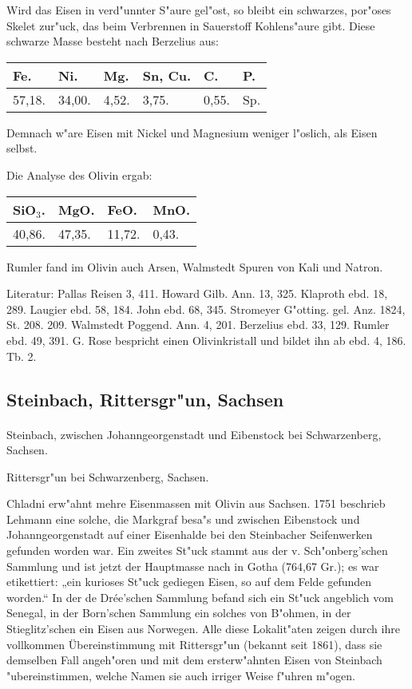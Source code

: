 \documentclass[a4paper, 11pt, oneside]{article}
\begin{document}
Wird das Eisen in verd"unnter S"aure gel"ost, so bleibt ein schwarzes, por"oses Skelet zur"uck, das beim Verbrennen in Sauerstoff Kohlens"aure gibt. Diese schwarze Masse besteht nach Berzelius aus:
\begin{table}[H]
    \centering
    \begin{tabular}{l l l l l l}
        Fe. & Ni. & Mg. & Sn, Cu. & C. & P. \\ \hline
        57,18. & 34,00. & 4,52. & 3,75. & 0,55. & Sp. \\
    \end{tabular}
\end{table}

Demnach w"are Eisen mit Nickel und Magnesium weniger l"oslich, als Eisen selbst.

Die Analyse des Olivin ergab:
\begin{table}[H]
    \centering
    \begin{tabular}{l l l l}
        SiO$_{3}$. & MgO. & FeO. & MnO. \\ \hline
        40,86. & 47,35. & 11,72. & 0,43. \\
    \end{tabular}
\end{table}

Rumler fand im Olivin auch Arsen, Walmstedt Spuren von Kali und Natron.

\footnotesize
Literatur: Pallas Reisen 3, 411. Howard Gilb. Ann. 13, 325. Klaproth ebd. 18, 289. Laugier ebd. 58, 184. John ebd. 68, 345. Stromeyer G"otting. gel. Anz. 1824, St. 208. 209. Walmstedt Poggend. Ann. 4, 201. Berzelius ebd. 33, 129. Rumler ebd. 49, 391. G. Rose bespricht einen Olivinkristall und bildet ihn ab ebd. 4, 186. Tb. 2.

\subsection{Steinbach, Rittersgr"un, Sachsen}
\normalsize
\paragraph{}
Steinbach, zwischen Johanngeorgenstadt und Eibenstock bei Schwarzenberg, Sachsen.

Rittersgr"un bei Schwarzenberg, Sachsen.

Chladni erw"ahnt mehre Eisenmassen mit Olivin aus Sachsen. 1751 beschrieb Lehmann eine solche, die Markgraf besa"s und zwischen Eibenstock und Johanngeorgenstadt auf einer Eisenhalde bei den Steinbacher Seifenwerken gefunden worden war. Ein zweites St"uck stammt aus der v. Sch"onberg'schen Sammlung und ist jetzt der Hauptmasse nach in Gotha (764,67 Gr.); es war etikettiert: „ein kurioses St"uck gediegen Eisen, so auf dem Felde gefunden worden.“ In der de Drée'schen Sammlung befand sich ein St"uck angeblich vom Senegal, in der Born'schen Sammlung ein solches von B"ohmen, in der Stieglitz'schen ein Eisen aus Norwegen. Alle diese Lokalit"aten zeigen durch ihre vollkommen Übereinstimmung mit Rittersgr"un (bekannt seit 1861), dass sie demselben Fall angeh"oren und mit dem ersterw"ahnten Eisen von Steinbach "ubereinstimmen, welche Namen sie auch irriger Weise f"uhren m"ogen.
\end{document}
